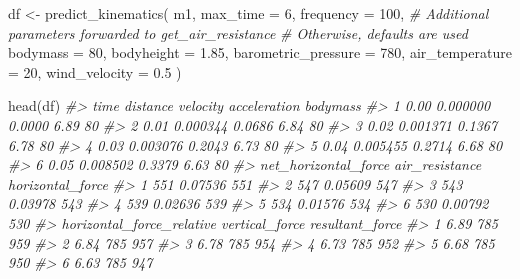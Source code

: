 \documentclass[fleqn,10pt,lineno]{wlpeerj} %
\newenvironment{Shaded}{\begin{snugshade}}{\end{snugshade}}
\newcommand{\AttributeTok}[1]{\textcolor[rgb]{0.77,0.63,0.00}{#1}}
\newcommand{\CommentTok}[1]{\textcolor[rgb]{0.56,0.35,0.01}{\textit{#1}}}
\newcommand{\DecValTok}[1]{\textcolor[rgb]{0.00,0.00,0.81}{#1}}
\newcommand{\FloatTok}[1]{\textcolor[rgb]{0.00,0.00,0.81}{#1}}
\newcommand{\FunctionTok}[1]{\textcolor[rgb]{0.00,0.00,0.00}{#1}}
\newcommand{\NormalTok}[1]{#1}
\newcommand{\OtherTok}[1]{\textcolor[rgb]{0.56,0.35,0.01}{#1}}
\begin{document}
\begin{Shaded}
\begin{Highlighting}[]
\NormalTok{df }\OtherTok{\textless{}{-}} \FunctionTok{predict\_kinematics}\NormalTok{(}
\NormalTok{  m1,}
  \AttributeTok{max\_time =} \DecValTok{6}\NormalTok{,}
  \AttributeTok{frequency =} \DecValTok{100}\NormalTok{,}
  \CommentTok{\# Additional parameters forwarded to get\_air\_resistance}
  \CommentTok{\# Otherwise, defaults are used}
  \AttributeTok{bodymass =} \DecValTok{80}\NormalTok{,}
  \AttributeTok{bodyheight =} \FloatTok{1.85}\NormalTok{,}
  \AttributeTok{barometric\_pressure =} \DecValTok{780}\NormalTok{,}
  \AttributeTok{air\_temperature =} \DecValTok{20}\NormalTok{,}
  \AttributeTok{wind\_velocity =} \FloatTok{0.5}
\NormalTok{)}

\FunctionTok{head}\NormalTok{(df)}
\CommentTok{\#\textgreater{}   time distance velocity acceleration bodymass}
\CommentTok{\#\textgreater{} 1 0.00 0.000000   0.0000         6.89       80}
\CommentTok{\#\textgreater{} 2 0.01 0.000344   0.0686         6.84       80}
\CommentTok{\#\textgreater{} 3 0.02 0.001371   0.1367         6.78       80}
\CommentTok{\#\textgreater{} 4 0.03 0.003076   0.2043         6.73       80}
\CommentTok{\#\textgreater{} 5 0.04 0.005455   0.2714         6.68       80}
\CommentTok{\#\textgreater{} 6 0.05 0.008502   0.3379         6.63       80}
\CommentTok{\#\textgreater{}   net\_horizontal\_force air\_resistance horizontal\_force}
\CommentTok{\#\textgreater{} 1                  551        0.07536              551}
\CommentTok{\#\textgreater{} 2                  547        0.05609              547}
\CommentTok{\#\textgreater{} 3                  543        0.03978              543}
\CommentTok{\#\textgreater{} 4                  539        0.02636              539}
\CommentTok{\#\textgreater{} 5                  534        0.01576              534}
\CommentTok{\#\textgreater{} 6                  530        0.00792              530}
\CommentTok{\#\textgreater{}   horizontal\_force\_relative vertical\_force resultant\_force}
\CommentTok{\#\textgreater{} 1                      6.89            785             959}
\CommentTok{\#\textgreater{} 2                      6.84            785             957}
\CommentTok{\#\textgreater{} 3                      6.78            785             954}
\CommentTok{\#\textgreater{} 4                      6.73            785             952}
\CommentTok{\#\textgreater{} 5                      6.68            785             950}
\CommentTok{\#\textgreater{} 6                      6.63            785             947}

\end{Highlighting}
\end{Shaded}
\end{document}

